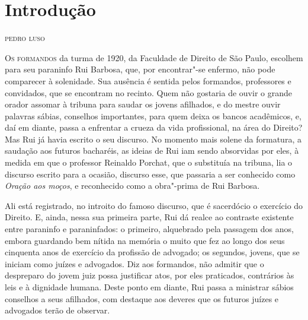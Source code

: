 \chapter[Introdução, \emph{por Pedro Luso}]{Introdução}

\begin{flushright}
\textsc{pedro luso}
\end{flushright}

\textsc{Os formandos} da turma de 1920, da Faculdade de Direito de São Paulo,
escolhem para seu paraninfo Rui Barbosa, que, por encontrar"-se enfermo,
não pode comparecer à solenidade. Sua ausência é sentida
pelos formandos, professores e convidados, que se encontram no recinto.
Quem não gostaria de ouvir o grande orador assomar à tribuna para
saudar os jovens afilhados, e do mestre ouvir palavras sábias,
conselhos importantes, para quem deixa os bancos acadêmicos, e, daí em
diante, passa a enfrentar a crueza da vida profissional, na área do
Direito? Mas Rui já havia escrito o seu discurso. No momento mais
solene da formatura, a saudação aos futuros bacharéis, as ideias de Rui
iam sendo absorvidas por eles, à medida em que o professor Reinaldo
Porchat, que o substituía na tribuna, lia o discurso escrito para a
ocasião, discurso esse, que passaria a ser conhecido como \textit{Oração aos
moços}, e reconhecido como a obra"-prima de Rui Barbosa. 

Ali está registrado, no introito do
famoso discurso, que é sacerdócio o exercício do Direito. E, ainda,
nessa sua primeira parte, Rui dá realce ao contraste existente entre
paraninfo e paraninfados: o primeiro, alquebrado pela passagem dos
anos, embora guardando bem nítida na memória o muito que fez ao longo
dos seus cinquenta anos de exercício da profissão de advogado; os
segundos, jovens, que se iniciam como juízes e advogados. Diz aos
formandos, não admitir que o despreparo do jovem juiz possa justificar
atos, por eles praticados, contrários às leis e à dignidade humana.
Deste ponto em diante, Rui passa a ministrar
sábios conselhos a seus afilhados, com destaque aos deveres que os
futuros juízes e advogados terão de observar. 

